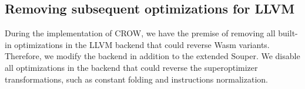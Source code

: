 \subsection{Removing subsequent optimizations for LLVM}

During the implementation of CROW, we have the premise of removing all built-in optimizations in the LLVM backend that could reverse Wasm variants.
Therefore, we modify the \wasm backend in addition to the extended Souper.
We disable all optimizations in the \wasm backend that could reverse the superoptimizer transformations, such as constant folding and instructions normalization.




